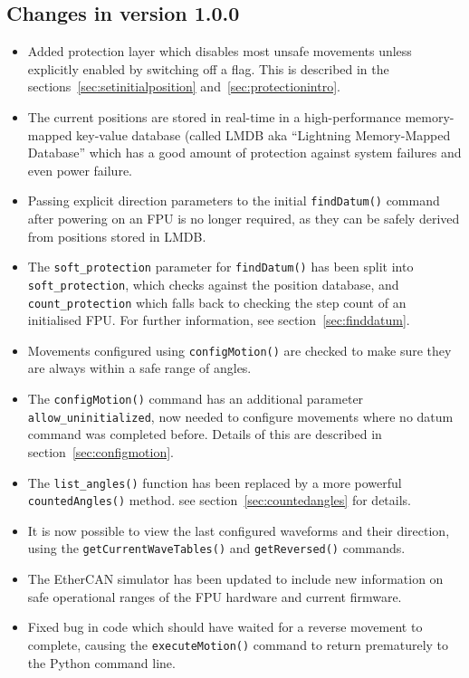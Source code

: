 \documentclass[11pt,a4paper]{report}
\begin{document}
\subsection*{Changes in version 1.0.0}
\begin{itemize}
\item Added protection layer which disables most unsafe movements
  unless explicitly enabled by switching off a flag. This is described
  in the sections~\ref{sec:setinitialposition}
  and~\ref{sec:protectionintro}.

\item The current positions are stored in real-time in a
  high-performance memory-mapped key-value database (called LMDB aka
  ``Lightning Memory-Mapped Database'' which has a good amount of
  protection against system failures and even power failure.

\item Passing explicit direction parameters to the initial
  \texttt{findDatum()} command after powering on an FPU is no longer
  required, as they can be safely derived from positions stored in
  LMDB.

\item The \texttt{soft\_protection} parameter for \texttt{findDatum()}
  has been split into \texttt{soft\_protection}, which checks against
  the position database, and \texttt{count\_protection} which falls
  back to checking the step count of an initialised FPU. For further
  information, see section~\ref{sec:finddatum}.

\item Movements configured using \texttt{configMotion()} are checked
  to make sure they are always within a safe range of angles.  
  
\item The \texttt{configMotion()} command has an additional parameter
  \texttt{allow\_uninitialized}, now needed to configure movements
  where no datum command was completed before. Details of this are
  described in section~\ref{sec:configmotion}.

\item The \texttt{list\_angles()} function has been replaced by a more
  powerful \texttt{countedAngles()} method. see
  section~\ref{sec:countedangles} for details.

\item It is now possible to view the last configured waveforms and
  their direction, using the \texttt{getCurrentWaveTables()} and
  \texttt{getReversed()} commands.
 
\item The EtherCAN simulator has been updated to include new
  information on safe operational ranges of the FPU hardware and
  current firmware.
  
\item Fixed bug in code which should have waited for a reverse
  movement to complete, causing the \texttt{executeMotion()} command
  to return prematurely to the Python command line.
  
\end{itemize}
\end{document}

